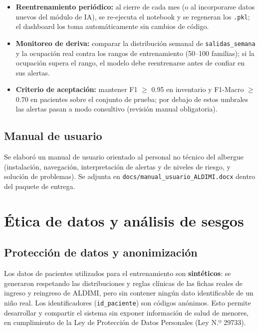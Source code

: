 \begin{itemize}[leftmargin=1.6em]
  \item \textbf{Reentrenamiento periódico:} al cierre de cada mes (o al
        incorporarse datos nuevos del módulo de IA), se re-ejecuta el
        notebook y se regeneran los \texttt{.pkl}; el dashboard los toma
        automáticamente sin cambios de código.
  \item \textbf{Monitoreo de deriva:} comparar la distribución semanal de
        \texttt{salidas\_semana} y la ocupación real contra los rangos de
        entrenamiento (50--100 familias); si la ocupación supera el rango,
        el modelo debe reentrenarse antes de confiar en sus alertas.
  \item \textbf{Criterio de aceptación:} mantener F1 $\geq$ 0.95 en
        inventario y F1-Macro $\geq$ 0.70 en pacientes sobre el conjunto de
        prueba; por debajo de estos umbrales las alertas pasan a modo
        consultivo (revisión manual obligatoria).
\end{itemize}

\subsection{Manual de usuario}

Se elaboró un manual de usuario orientado al personal no técnico del
albergue (instalación, navegación, interpretación de alertas y de niveles de
riesgo, y solución de problemas). Se adjunta en
\texttt{docs/manual\_usuario\_ALDIMI.docx} dentro del paquete de entrega.

\section{Ética de datos y análisis de sesgos}

\subsection{Protección de datos y anonimización}

Los datos de pacientes utilizados para el entrenamiento son
\textbf{sintéticos}: se generaron respetando las distribuciones y reglas
clínicas de las fichas reales de ingreso y reingreso de ALDIMI, pero sin
contener ningún dato identificable de un niño real. Los identificadores
(\texttt{id\_paciente}) son códigos anónimos. Esto permite desarrollar y
compartir el sistema sin exponer información de salud de menores, en
cumplimiento de la Ley de Protección de Datos Personales (Ley N.º 29733).


